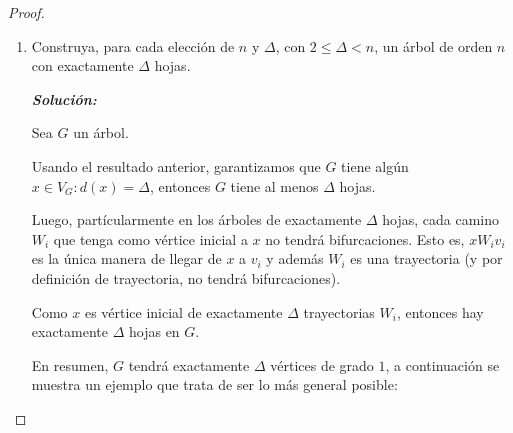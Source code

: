 \documentclass{article}
\begin{document}
\begin{enumerate}
\begin{proof}
\begin{enumerate}
\begin{enumerate}
\begin{proof}
          Luego, como $x$ tiene $\Delta$ vecinos, entonces podemos tomar al menos
          $\Delta$ trayectorias distintas entre ellas tales que terminen en alg\'un
          v\'ertice $u_i$ ($1 \leq i \leq \Delta$).

          Así, cada $u_i$ es una hoja de $G$ y como hemos encontrado $\Delta$ hojas
          podemos concluir que el \'arbol $G$ con grado m\'aximo $\Delta$ tiene al menos
          $\Delta$ hojas. \\
          \\
        \end{proof}
  \newpage
      \item Construya, para cada elecci\'on de $n$ y $\Delta$,
        con $2\le \Delta < n$, un \'arbol de orden $n$ con
        exactamente $\Delta$ hojas.

          \textbf{\textit{Soluci\'on:}}

          Sea $G$ un \'arbol.

          Usando el resultado anterior, garantizamos que $G$ tiene alg\'un
          $x \in V_G : d(x) = \Delta$, entonces $G$ tiene al menos $\Delta$ hojas.

          Luego, part\'icularmente en los \'arboles de
          exactamente $\Delta$ hojas, cada camino $W_i$ que tenga como v\'ertice
          inicial a $x$ no tendr\'a bifurcaciones. Esto es, $x W_i v_i$ es la
          \'unica manera de llegar de $x$ a $v_i$ y adem\'as $W_i$ es una trayectoria
          (y por definici\'on de trayectoria, no tendr\'a bifurcaciones).

          Como $x$ es v\'ertice inicial de exactamente $\Delta$ trayectorias $W_i$,
          entonces hay exactamente $\Delta$ hojas en $G$.

          En resumen, $G$ tendr\'a exactamente $\Delta$ v\'ertices de grado $1$,
          a continuaci\'on se muestra un ejemplo que trata de ser lo m\'as general
          posible:

        \begin{figure}[ht!]
          \centering
\end{figure}
\end{enumerate}
\end{enumerate}
\end{proof}
\end{enumerate}
\end{document}
